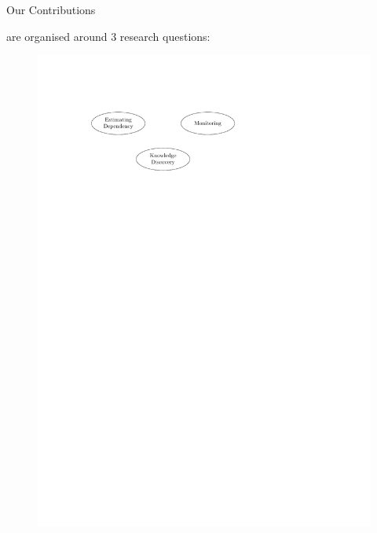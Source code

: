 \documentclass[16pt,usenames,dvipsnames, notheorems]{beamer}
\theoremstyle{definition}
\theoremstyle{example}
\theoremstyle{plain}
\begin{document}
\begin{frame}{Our Contributions}

are organised around 3 research questions: 
\begin{figure}
	\begin{overprint}
		 \includegraphics[width=1.0 \linewidth]{figures/outline_c_0-compressed.pdf}

\end{overprint}
\end{figure}
\end{frame}
\end{document}

